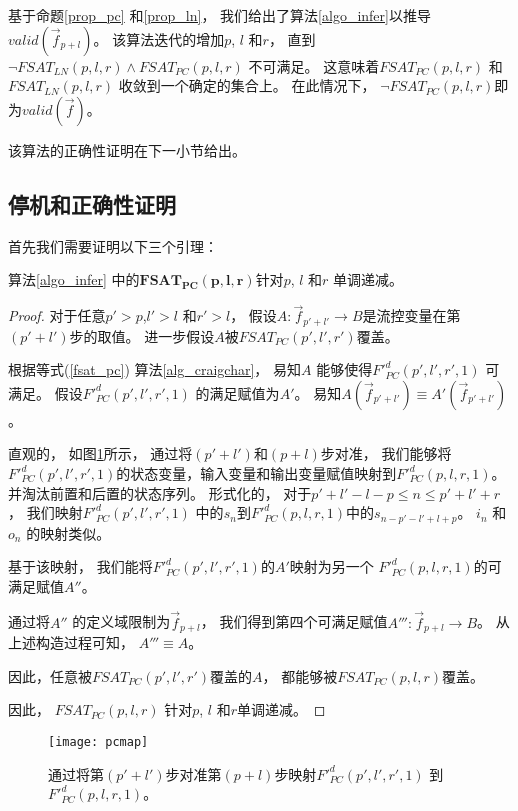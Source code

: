 基于命题\ref{prop_pc} 和\ref{prop_ln}，
我们给出了算法\ref{algo_infer}以推导$valid(\vec{f}_{p+l})$。
该算法迭代的增加$p$, $l$ 和$r$，
直到$\neg FSAT_{LN}(p,l,r)\wedge FSAT_{PC}(p,l,r)$ 不可满足。
这意味着$FSAT_{PC}(p,l,r)$ 和$FSAT_{LN}(p,l,r)$ 收敛到一个确定的集合上。
在此情况下，
$\neg FSAT_{PC}(p,l,r)$即为$valid(\vec{f})$。

该算法的正确性证明在下一小节给出。

\subsection{停机和正确性证明}\label{subsec_proofterm}

首先我们需要证明以下三个引理：

\begin{lemma}\label{lemmapcdec}
算法\ref{algo_infer} 中的$\mathbf{FSAT_{PC}(p,l,r)}$针对$p$, $l$ 和$r$ 单调递减。
\end{lemma}
\begin{proof}
对于任意$p'>p$,$l'>l$ 和$r'>l$，
假设$A:\vec{f}_{p'+l'}\to B$是流控变量在第$(p'+l')$步的取值。
进一步假设$A$被$FSAT_{PC}(p',l',r')$覆盖。

根据等式(\ref{fsat_pc}) 算法\ref{alg_craigchar}，
易知$A$ 能够使得$F'^d_{PC}(p',l',r',1)$ 可满足。
假设$F'^d_{PC}(p',l',r',1)$ 的满足赋值为$A'$。
易知$A(\vec{f}_{p'+l'})\equiv A'(\vec{f}_{p'+l'})$。

直观的，
如图\ref{fig_pcmap}所示，
通过将$(p'+l')$和$(p+l)$步对准，
我们能够将$F'^d_{PC}(p',l',r',1)$的状态变量，输入变量和输出变量赋值映射到$F'^d_{PC}(p,l,r,1)$。
并淘汰前置和后置的状态序列。
形式化的，
对于$p'+l'-l-p\le n\le p'+l'+r$，
我们映射$F'^d_{PC}(p',l',r',1)$ 中的$s_n$到$F'^d_{PC}(p,l,r,1)$中的$s_{n-p'-l'+l+p}$。
$i_n$ 和$o_n$ 的映射类似。

基于该映射，
我们能将$F'^d_{PC}(p',l',r',1)$的$A'$映射为另一个
$F'^d_{PC}(p,l,r,1)$的可满足赋值$A''$。

通过将$A''$ 的定义域限制为$\vec{f}_{p+l}$，
我们得到第四个可满足赋值$A''':\vec{f}_{p+l}\to B$。
从上述构造过程可知，
$A'''\equiv A$。

因此，任意被$FSAT_{PC}(p',l',r')$覆盖的$A$，
都能够被$FSAT_{PC}(p,l,r)$覆盖。

因此，
$FSAT_{PC}(p,l,r)$ 针对$p$, $l$ 和$r$单调递减。
\end{proof}

\begin{figure}[t]
\begin{center}
\texttt{[image: pcmap]}
\end{center}
\caption{通过将第$(p'+l')$步对准第$(p+l)$步映射$F'^d_{PC}(p',l',r',1)$ 到$F'^d_{PC}(p,l,r,1)$。}
  \label{fig_pcmap}
\end{figure}

